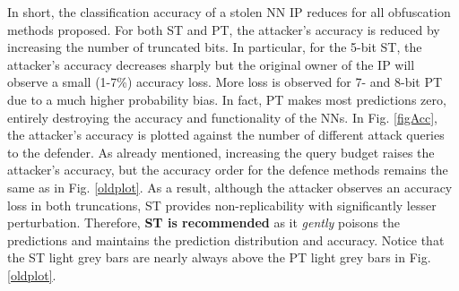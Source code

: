 \documentclass[10pt, twocolumn, conference]{IEEEtran}
\begin{document}
In short, the classification accuracy of a stolen NN IP reduces for all obfuscation methods proposed. For both ST and PT, the attacker's accuracy is reduced by increasing the number of truncated bits. In particular, for the 5-bit ST, the attacker's accuracy decreases sharply but the original owner of the IP will observe a small (1-7\%) accuracy loss. More loss is observed for 7- and 8-bit PT due to a much higher probability bias. In fact, PT makes most predictions zero, entirely destroying the accuracy and functionality of the NNs. In Fig. \ref{figAcc}, the attacker's accuracy is plotted against the number of different attack queries to the defender. As already mentioned, increasing the query budget raises the attacker's accuracy, but the accuracy order for the defence methods remains the same as in Fig. \ref{oldplot}.   
As a result, although the attacker observes an accuracy loss in both truncations, ST provides non-replicability with significantly lesser perturbation. Therefore, \textbf{ST is recommended} as it \emph{gently} poisons the predictions and maintains the prediction distribution and accuracy. Notice that the ST light grey bars are nearly always above the PT light grey bars in Fig. \ref{oldplot}.



\end{document}
